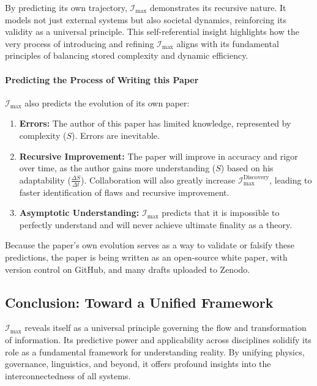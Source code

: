 \documentclass[12pt]{article}
\begin{document}
By predicting its own trajectory, \(\mathcal{I}_{\text{max}}\) demonstrates its recursive nature. It models not just external systems but also societal dynamics, reinforcing its validity as a universal principle. This self-referential insight highlights how the very process of introducing and refining \( \mathcal{I}_{\text{max}} \) aligns with its fundamental principles of balancing stored complexity and dynamic efficiency.

\paragraph{Predicting the Process of Writing this Paper} \(\mathcal{I}_{\text{max}}\) also predicts the evolution of its own paper:
\begin{enumerate}
    \item \textbf{Errors:} The author of this paper has limited knowledge, represented by complexity (\(S\)). Errors are inevitable.
    \item \textbf{Recursive Improvement:} The paper will improve in accuracy and rigor over time, as the author gains more understanding (\(S\)) based on his adaptability (\(\frac{\Delta S}{\Delta t}\)). Collaboration will also greatly increase \(\mathcal{I}_{\text{max}}^{\text{Discovery}}\), leading to faster identification of flaws and recursive improvement. 
    \item \textbf{Asymptotic Understanding:} \(\mathcal{I}_{\text{max}}\) predicts that it is impossible to perfectly understand and will never achieve ultimate finality as a theory.
\end{enumerate}

Because the paper's own evolution serves as a way to validate or falsify these predictions, the paper is being written as an open-source white paper, with version control on GitHub, and many drafts uploaded to Zenodo.


\subsection{Conclusion: Toward a Unified Framework}
\(\mathcal{I}_{\text{max}}\) reveals itself as a universal principle governing the flow and transformation of information. Its predictive power and applicability across disciplines solidify its role as a fundamental framework for understanding reality. By unifying physics, governance, linguistics, and beyond, it offers profound insights into the interconnectedness of all systems.
\end{document}
